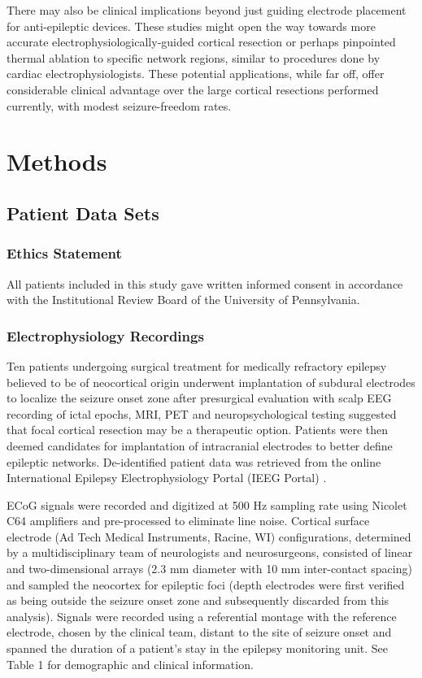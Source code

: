 There may also be clinical implications beyond just guiding electrode placement for anti-epileptic devices. These studies might open the way towards more accurate electrophysiologically-guided cortical resection or perhaps pinpointed thermal ablation to specific network regions, similar to procedures done by cardiac electrophysiologists. These potential applications, while far off, offer considerable clinical advantage over the large cortical resections performed currently, with modest seizure-freedom rates.  

\section{Methods}
\subsection{Patient Data Sets}
\subsubsection{Ethics Statement}
All patients included in this study gave written informed consent in accordance with the Institutional Review Board of the University of Pennsylvania.

\subsubsection{Electrophysiology Recordings}
Ten patients undergoing surgical treatment for medically refractory epilepsy believed to be of neocortical origin underwent implantation of subdural electrodes to localize the seizure onset zone after presurgical evaluation with scalp EEG recording of ictal epochs, MRI, PET and neuropsychological testing suggested that focal cortical resection may be a therapeutic option. Patients were then deemed candidates for implantation of intracranial electrodes to better define epileptic networks. De-identified patient data was retrieved from the online International Epilepsy Electrophysiology Portal (IEEG Portal) \cite{wagenaar2013multimodal}.

ECoG signals were recorded and digitized at 500 Hz sampling rate using Nicolet C64 amplifiers and pre-processed to eliminate line noise. Cortical surface electrode (Ad Tech Medical Instruments, Racine, WI) configurations, determined by a multidisciplinary team of neurologists and neurosurgeons, consisted of linear and two-dimensional arrays (2.3 mm diameter with 10 mm inter-contact spacing) and sampled the neocortex for epileptic foci (depth electrodes were first verified as being outside the seizure onset zone and subsequently discarded from this analysis). Signals were recorded using a referential montage with the reference electrode, chosen by the clinical team, distant to the site of seizure onset and spanned the duration of a patient's stay in the epilepsy monitoring unit. See Table 1 for demographic and clinical information.

